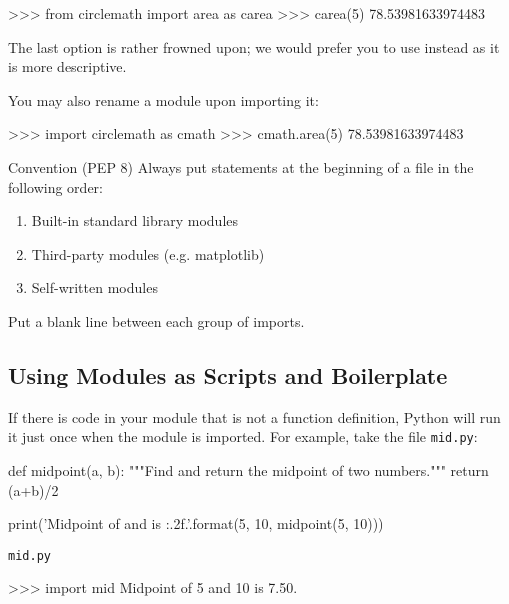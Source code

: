 \documentclass[11pt]{cselabheader}
\begin{document}
\begin{pyconcode}
>>> from circlemath import area as carea
>>> carea(5)
78.53981633974483
\end{pyconcode}

The last option is rather frowned upon; we would prefer you to use
 instead as it is more descriptive.

You may also rename a module upon importing it:

\begin{pyconcode}
>>> import circlemath as cmath
>>> cmath.area(5)
78.53981633974483
\end{pyconcode}


\begin{infobox}{Convention (PEP 8)}
  Always put  statements at the beginning of a file in the
  following order:
  \begin{enumerate}
    \item Built-in standard library modules
    \item Third-party modules (e.g. matplotlib)
    \item Self-written modules
  \end{enumerate}
  Put a blank line between each group of imports.
\end{infobox}

\subsection{Using Modules as Scripts and Boilerplate}

If there is code in your module that is not a function definition, Python will
run it just once when the module is imported. For example, take the file
\texttt{mid.py}:

\begin{listing}[H]
  \vspace{-0.5em}
\begin{python3code}
def midpoint(a, b):
    """Find and return the midpoint of two numbers."""
    return (a+b)/2

print('Midpoint of {} and {} is {:.2f}.'.format(5, 10, midpoint(5, 10)))
\end{python3code}
  \vspace{-1em}
  \caption{\texttt{mid.py}}
  \vspace{-0.5em}
\end{listing}

\begin{pyconcode}
>>> import mid
Midpoint of 5 and 10 is 7.50.
\end{pyconcode}
\end{document}
